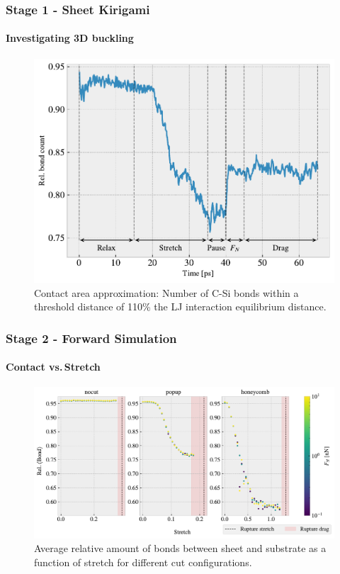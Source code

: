 \documentclass[
	10pt, %
]{beamer}
\begin{document}
\begin{frame}
	\frametitle{Stage 1 - Sheet Kirigami}
	\framesubtitle{Investigating 3D buckling}
	\begin{figure}
		\includegraphics[height=0.7\textheight]{figures/contact_pct.pdf}
		\caption{Contact area approximation: Number of C-Si bonds within a threshold distance of 110\% the LJ interaction equilibrium distance.}
	\end{figure}	
\end{frame}


\begin{frame}
	\frametitle{Stage 2 - Forward Simulation}
	\framesubtitle{Contact vs.\,Stretch}
	\begin{figure}
		\includegraphics[height=0.65\textheight]{figures/multi_stretch_area_compare.pdf}
		\caption{Average relative amount of bonds between sheet and substrate as a function of stretch for different cut configurations.}
	\end{figure}	
\end{frame}
\end{document}
